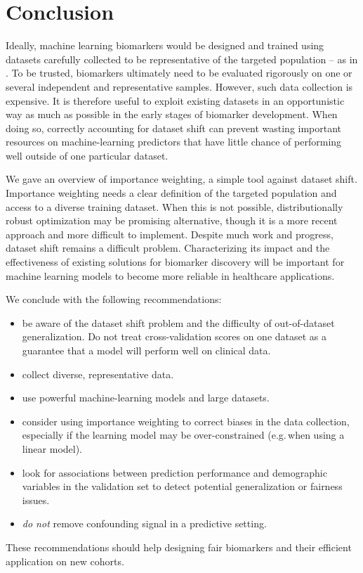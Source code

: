 \documentclass[twocolumn]{article}
\newcommand{\eg}{e.g.\,}
\begin{document}
\section{Conclusion}
%
Ideally, machine learning biomarkers would be designed and trained using
datasets carefully collected to be representative of the
targeted population -- as in \citet{liu2020sensitive}.
%
To be trusted, biomarkers ultimately need to be evaluated rigorously on one or several
independent and representative samples.
%
However, such data collection is expensive. It is therefore useful to
exploit existing datasets in an opportunistic way as much as possible in the
early stages of biomarker development.
%
When doing so, correctly accounting for dataset shift can prevent wasting
important resources on machine-learning predictors that have little chance of
performing well outside of one particular dataset.
%

We gave an overview of importance weighting, a simple tool against dataset
shift.
%
Importance weighting needs a clear definition of the targeted population and
access to a diverse training dataset. When this is not possible,
distributionally robust optimization may be promising alternative, though it
is a more recent approach and more difficult to implement.
%
Despite much work and progress, dataset shift remains a difficult problem.
Characterizing its impact and the effectiveness of existing solutions for biomarker discovery will be important for machine learning models to become more reliable in healthcare applications.

We conclude with the following recommendations:
\begin{itemize}
  \item be aware of the dataset shift problem and the difficulty of out-of-dataset generalization. Do not treat cross-validation scores on one dataset as a guarantee that a model will perform well on clinical data.
  \item collect diverse, representative data.
  \item use powerful machine-learning models and large datasets.
  \item consider using importance weighting to correct biases in the data
collection, especially if the learning model may be over-constrained (\eg when using a linear model).
  \item look for associations between prediction performance and demographic variables in the validation set to detect potential generalization or fairness issues.
  \item \emph{do not} remove confounding signal in a predictive setting.
\end{itemize}
These recommendations should help designing fair biomarkers and their efficient application on new cohorts.
\end{document}
